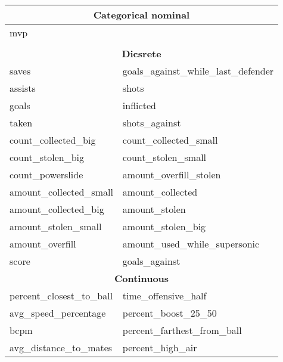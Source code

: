 \pagebreak
\begin{longtable}{p{} p{}} 
\toprule
\multicolumn{2}{c}{\textbf{Categorical nominal}}                                        \\
\midrule
mvp                                     &                                         \\
 & \\
\toprule
\multicolumn{2}{c}{\textbf{Dicsrete}} \\
\midrule
saves                                   & goals\_against\_while\_last\_defender   \\
assists                                 & shots                                   \\
goals                                   & inflicted                               \\
taken                                   & shots\_against                          \\
count\_collected\_big                   & count\_collected\_small                 \\
count\_stolen\_big                      & count\_stolen\_small                    \\
count\_powerslide                       & amount\_overfill\_stolen                \\
amount\_collected\_small                & amount\_collected                       \\
amount\_collected\_big                  & amount\_stolen                          \\
amount\_stolen\_small                   & amount\_stolen\_big                     \\
amount\_overfill                        & amount\_used\_while\_supersonic         \\
score                                   & goals\_against                          \\
\toprule
\multicolumn{2}{c}{\textbf{Continuous}}                                           \\
\midrule
percent\_closest\_to\_ball              & time\_offensive\_half                   \\
avg\_speed\_percentage                  & percent\_boost\_25\_50                  \\
bcpm                                    & percent\_farthest\_from\_ball           \\
avg\_distance\_to\_mates                & percent\_high\_air                      \\

\end{longtable}

